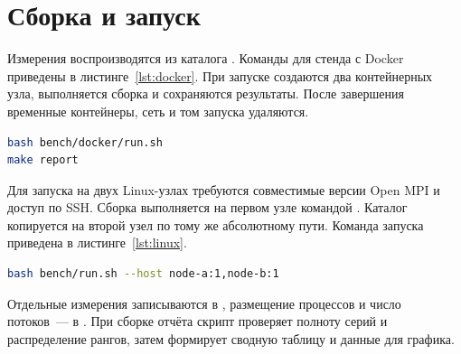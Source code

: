 \clearpage
\section{Сборка и запуск}

Измерения воспроизводятся из каталога . Команды для стенда с Docker приведены в листинге~\ref{lst:docker}. При запуске создаются два контейнерных узла, выполняется сборка и сохраняются результаты. После завершения временные контейнеры, сеть и том запуска удаляются.

\begin{lstlisting}[language=bash,caption={Запуск измерений и сборка отчёта},label={lst:docker}]
bash bench/docker/run.sh
make report
\end{lstlisting}

Для запуска на двух Linux-узлах требуются совместимые версии Open MPI и доступ по SSH. Сборка выполняется на первом узле командой . Каталог  копируется на второй узел по тому же абсолютному пути. Команда запуска приведена в листинге~\ref{lst:linux}.

\begin{lstlisting}[language=bash,caption={Запуск замеров на двух Linux-узлах},label={lst:linux}]
bash bench/run.sh --host node-a:1,node-b:1
\end{lstlisting}

Отдельные измерения записываются в , размещение процессов и число потоков~--- в . При сборке отчёта скрипт  проверяет полноту серий и распределение рангов, затем формирует сводную таблицу и данные для графика.


